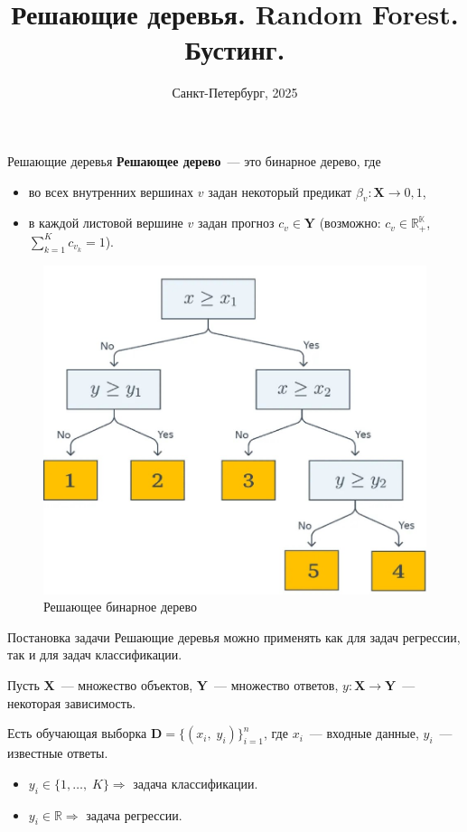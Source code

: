 \documentclass[notheorems, handout]{beamer}
\title[Статистическое и машинное обучение]{Решающие деревья. Random Forest. Бустинг.}
\institute[Санкт-Петербургский Государственный Университет]{%
	\small
	Санкт-Петербургский государственный университет\\
	Кафедра статистического моделирования
}
\date[Сентябрь 2025]{Санкт-Петербург, 2025}
\begin{document}
\begin{frame}
    \titlepage
\end{frame}

\begin{frame}{Решающие деревья}
\textbf{Решающее дерево}~--- это бинарное дерево, где
\begin{itemize}
	\item во всех внутренних вершинах $v$ задан некоторый предикат $\beta_{v}: \mathbf{X} \to {0{,} 1}$,
	\item в каждой листовой вершине $v$ задан прогноз $c_{v} \in \mathbf{Y}$ (возможно: $c_{v} \in \mathbb{R_{+}^{K}}$, \; $\displaystyle\sum_{k = 1}^{K} c_{v_{k}} = 1$).
\end{itemize}
\par\smallskip
\begin{figure}[h!]
  \includegraphics[width=0.4 \textwidth]{img/detree}
 \caption{Решающее бинарное дерево}
 \end{figure}
\end{frame}

\begin{frame}{Постановка задачи}
Решающие деревья можно применять как для задач регрессии,
так и для задач классификации. 
\par\smallskip
Пусть $\mathbf{X}$~--- множество объектов, $\mathbf{Y}$~--- множество ответов, $y: \mathbf{X} \to \mathbf{Y}$~--- некоторая зависимость.
\par\smallskip
Есть обучающая выборка $\mathbf{D} = \{(x_{i}{,} \; y_{i})\}_{i = 1}^{n}$, где $x_{i}$~--- входные данные, $y_{i}$~--- известные ответы.
\par\smallskip
\begin{itemize}
	\item $y_{i} \in \{1{,}\dots{,}\;K\} \Rightarrow$ задача классификации.
	\item $y_{i} \in \mathbb{R} \Rightarrow$ задача регрессии.
\end{itemize}
\end{frame}
\end{document}
